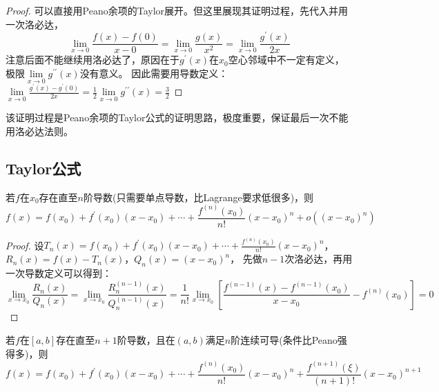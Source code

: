 \begin{proof}
  可以直接用Peano余项的Taylor展开。但这里展现其证明过程，先代入并用一次洛必达，
  \begin{equation*}
    \lim \limits _{x \rightarrow 0}\frac{f(x) - f(0)}{x - 0} = \lim \limits _{x \rightarrow 0}\frac{g(x)}{x^2}
    = \lim \limits _{x \rightarrow 0}\frac{g^{\prime}(x)}{2x}
  \end{equation*}
  注意后面不能继续用洛必达了，原因在于$g^{\prime}(x)$在$x_0$空心邻域中不一定有定义，极限$\lim \limits _{x \rightarrow 0}g^{\prime\prime}(x)$没有意义。
  因此需要用导数定义：$\lim \limits _{x \rightarrow 0}\frac{g^{\prime}(x) - g^{\prime}(0)}{2x} = \frac{1}{2}\lim \limits _{x \rightarrow 0} g^{\prime\prime}(x) = \frac{3}{2}$
\end{proof}

\begin{note}
  该证明过程是Peano余项的Taylor公式的证明思路，极度重要，保证最后一次不能用洛必达法则。
\end{note}

\subsection{Taylor公式}

\begin{theorem}[Peano余项Taylor公式]
  若$f$在$x_0$存在直至$n$阶导数(只需要单点导数，比Lagrange要求低很多)，则
  \begin{equation*}
    f(x) = f(x_0) + f^{\prime}(x_0)(x - x_0) + \cdots + \frac{f^{(n)}(x_0)}{n!}(x-x_0)^n  + o((x - x_0)^n)
  \end{equation*}
\end{theorem}

\begin{proof}
  设$T_n(x) = f(x_0) + f^{\prime}(x_0)(x - x_0) + \cdots + \frac{f^{(n)}(x_0)}{n!}(x - x_0)^n$，
  $R_n(x) = f(x) - T_n(x)$，$Q_n(x) = (x - x_0)^n$，
  先做$n-1$次洛必达，再用一次导数定义可以得到：
  \begin{equation*}
    \lim \limits _{x \rightarrow x_0}\frac{R_n(x)}{Q_n(x)} = \lim \limits _{x \rightarrow x_0}\frac{R_n^{(n-1)}(x)}{Q_n^{(n-1)}(x)} = \frac{1}{n!} \lim \limits _{x \rightarrow x_0} \left[ \frac{f^{(n-1)}(x) - f^{(n-1)}(x_0)}{x - x_0} - f^{(n)}(x_0) \right] = 0
  \end{equation*}
\end{proof}

\begin{theorem}[Lagrange余项Taylor公式]
  若$f$在$[a,b]$存在直至$n+1$阶导数，且在$(a,b)$满足$n$阶连续可导(条件比Peano强得多)，则
  \begin{equation*}
    f(x) = f(x_0) + f^{\prime}(x_0)(x - x_0) + \cdots + \frac{f^{(n)}(x_0)}{n!}(x-x_0)^n  + \frac{f^{(n+1)}(\xi)}{(n+1)!}(x - x_0)^{n+1}
  \end{equation*}
\end{theorem}

